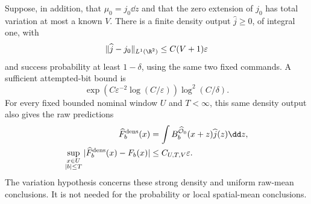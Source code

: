 \begin{corollary}
\label{cor:two-field-finite-density}
Suppose, in addition, that $\mu_0=j_0\dd z$ and that the zero
extension of $j_0$ has total variation at most a known $V$.
There is a finite density output $\widehat j\ge0$, of integral one,
with
\[
                    \|\widehat j-j_0\|_{L^1(\R^2)}
                                    \le C(V+1)\varepsilon
\]
and success probability at least $1-\delta$, using the same two
fixed commands.  A sufficient attempted-bit bound is
\begin{equation}\label{eq:two-field-BV-density-cost}
 \exp\!\left(C\varepsilon^{-2}\log(C/\varepsilon)\right)
                                  \log^2(C/\delta).
\end{equation}
For every fixed bounded nominal window $U$ and $T<\infty$, this
same density output also gives the raw predictions
\begin{align}
 \widehat F_b^{\rm dens}(x)
   &=\int B_b^{\widehat{\mathcal O}_0}(x+z)
                                  \widehat j(z)\dd z,
                       \label{eq:two-field-density-prediction}\\
 \sup_{\substack{x\in U\\ |b|\le T}}
      |\widehat F_b^{\rm dens}(x)-F_b(x)|
   &\le C_{U,T,V}\varepsilon.
                       \label{eq:two-field-uniform-prediction}
\end{align}
The variation hypothesis concerns these strong density and uniform
raw-mean conclusions.  It is not needed for the probability or
local spatial-mean conclusions.
\end{corollary}
